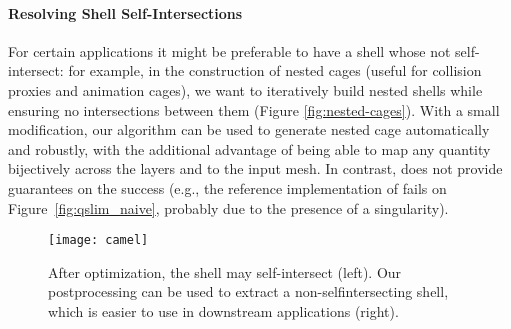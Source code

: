 \paragraph{Resolving Shell Self-Intersections}
\label{sec:postprocessing}
For certain applications it might be preferable to have a shell whose   not self-intersect:
for example, in the construction of nested cages \cite{sacht2015nested} (useful for collision proxies and animation cages), we want to iteratively build nested shells while ensuring no intersections between them (Figure \ref{fig:nested-cages}). 
With a small modification, our algorithm can be used to generate nested cage automatically and robustly, with the additional advantage of being able to map any quantity  bijectively across the layers and to the input mesh. In contrast, \cite{sacht2015nested}
does not provide guarantees on the success (e.g., the reference implementation of \cite{sacht2015nested} fails on Figure~\ref{fig:qslim_naive}, probably due to the presence of a singularity). 
\begin{figure}
    \centering
    \texttt{[image: camel]}
    \caption{After optimization, the shell may self-intersect (left). Our postprocessing can be used to extract a non-selfintersecting shell, which is easier to use in downstream applications (right).}
    \label{fig:shell_shrinking-cages}
    
\end{figure}

